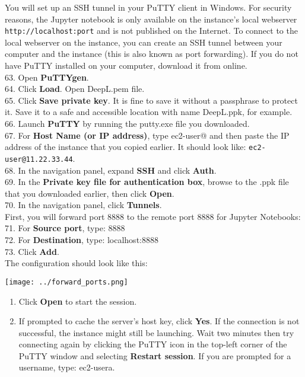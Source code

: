 \documentclass[]{book}
\providecommand{\tightlist}{%
  \setlength{\itemsep}{0pt}\setlength{\parskip}{0pt}}
\begin{document}
You will set up an SSH tunnel in your PuTTY client in Windows. For security reasons, the Jupyter notebook is only available on the instance's local webserver \texttt{http://localhost:port} and is not published on the Internet. To connect to the local webserver on the instance, you can create an SSH tunnel between your computer and the instance (this is also known as port forwarding). If you do not have PuTTY installed on your computer, download it from online.\\
63. Open \textbf{PuTTYgen}.\\
64. Click \textbf{Load}. Open DeepL.pem file.\\
65. Click \textbf{Save private key}. It is fine to save it without a passphrase to protect it. Save it to a safe and accessible location with name DeepL.ppk, for example.\\
66. Launch \textbf{PuTTY} by running the putty.exe file you downloaded.\\
67. For \textbf{Host Name (or IP address)}, type ec2-user@ and then paste the IP address of the instance that you copied earlier. It should look like: \texttt{ec2-user@11.22.33.44}.\\
68. In the navigation panel, expand \textbf{SSH} and click \textbf{Auth}.\\
69. In the \textbf{Private key file for authentication box}, browse to the .ppk file that you downloaded earlier, then click \textbf{Open}.\\
70. In the navigation panel, click \textbf{Tunnels}.\\
First, you will forward port 8888 to the remote port 8888 for Jupyter Notebooks:\\
71. For \textbf{Source port}, type: 8888\\
72. For \textbf{Destination}, type: localhost:8888\\
73. Click \textbf{Add}.\\
The configuration should look like this:

\texttt{[image: ../forward\_ports.png]}

\begin{enumerate}
\def\labelenumi{\arabic{enumi}.}
\setcounter{enumi}{73}
\tightlist
\item
  Click \textbf{Open} to start the session.
\item
  If prompted to cache the server's host key, click \textbf{Yes}. If the connection is not successful, the instance might still be launching. Wait two minutes then try connecting again by clicking the PuTTY icon in the top-left corner of the PuTTY window and selecting \textbf{Restart session}. If you are prompted for a username, type: ec2-usera.
\end{enumerate}
\end{document}
